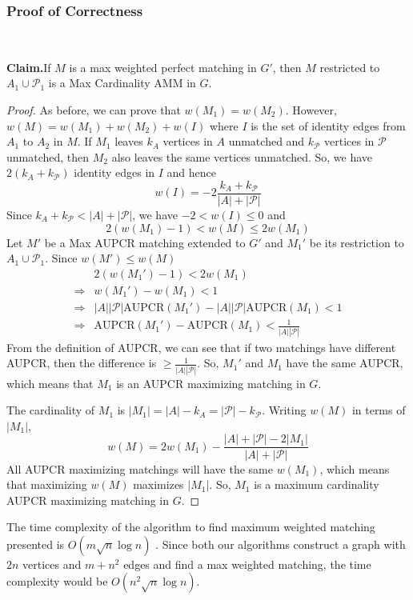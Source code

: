 \documentclass[letterpaper]{article} %
\newenvironment{claim}[1]{\par\noindent\textbf{Claim.}\space#1}{}
\begin{document}
\subsubsection{Proof of Correctness} ~\\
\begin{claim}
If $M$ is a max weighted perfect matching in $G'$, then $M$ restricted to $A_1 \cup \mathcal{P}_1$ is a Max Cardinality AMM in $G$.
\end{claim}
\begin{proof}
As before, we can prove that $w(M_1) = w(M_2)$. However, $w(M) = w(M_1) + w(M_2) + w(I)$ where $I$ is the set of identity edges from $A_1$ to $A_2$ in $M$. If $M_1$ leaves $k_A$ vertices in $A$ unmatched and $k_{\mathcal{P}}$ vertices in $\mathcal{P}$ unmatched, then $M_2$ also leaves the same vertices unmatched. So, we have $2(k_A + k_{\mathcal{P}})$ identity edges in $I$ and hence $$w(I) = -2\frac{k_A+k_{\mathcal{P}}}{|A|+|\mathcal{P}|}$$
Since $k_A + k_{\mathcal{P}} < |A| + |\mathcal{P}|$, we have $-2 < w(I) \le 0$ and
$$2(w(M_1)-1) < w(M) \le 2w(M_1)$$
Let $M'$ be a Max AUPCR matching extended to $G'$ and $M_1'$ be its restriction to $A_1 \cup \mathcal{P}_1$. Since $w(M') \le w(M)$
\begin{align*}
& 2(w(M_1')-1) < 2w(M_1) \\
\Rightarrow & w(M_1') - w(M_1) < 1 \\
\Rightarrow & |A||\mathcal{P}|\text{AUPCR}(M_1') - |A||\mathcal{P}|\text{AUPCR}(M_1) < 1\\
\Rightarrow & \text{AUPCR}(M_1') - \text{AUPCR}(M_1) < \frac{1}{|A||\mathcal{P}|}
\end{align*}
From the definition of AUPCR, we can see that if two matchings have different AUPCR, then the difference is $\ge \frac{1}{|A| |\mathcal{P}|}$. So, $M_1'$ and $M_1$ have the same AUPCR, which means that $M_1$ is an AUPCR maximizing matching in $G$.

The cardinality of $M_1$ is $|M_1| = |A|-k_A = |\mathcal{P}|-k_{\mathcal{P}}$. Writing $w(M)$ in terms of $|M_1|$,
$$w(M) = 2w(M_1) - \frac{|A|+|\mathcal{P}|-2|M_1|}{|A|+|\mathcal{P}|}$$
All AUPCR maximizing matchings will have the same $w(M_1)$, which means that maximizing $w(M)$ maximizes $|M_1|$. So, $M_1$ is a maximum cardinality AUPCR maximizing matching in $G$.
\end{proof}

The time complexity of the algorithm to find maximum weighted matching presented is $O(m\sqrt{n}\log n)$ \cite{maxweight}. Since both our algorithms construct a graph with $2n$ vertices and $m + n^2$ edges and find a max weighted matching, the time complexity would be $O(n^2\sqrt{n}\log n)$.
\end{document}
